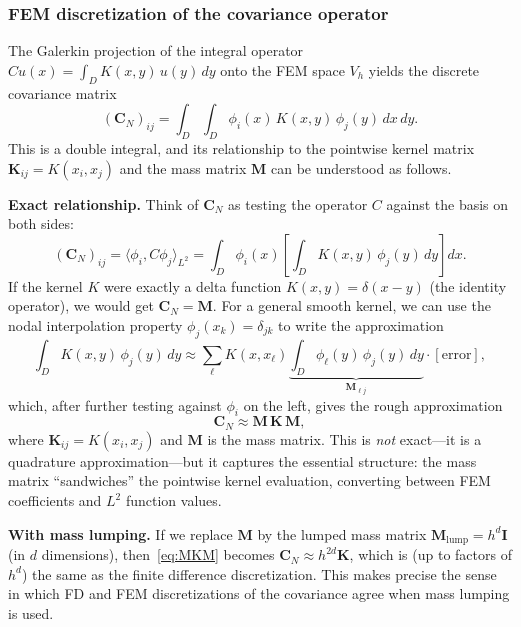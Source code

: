 \documentclass[11pt]{article}
\newcommand{\Cov}{\mathbf{C}}
\newcommand{\bK}{\mathbf{K}}
\newcommand{\bM}{\mathbf{M}}
\begin{document}
\subsubsection{FEM discretization of the covariance operator}\label{sec:FEM_cov}

The Galerkin projection of the integral operator $Cu(x) = \int_D K(x,y)\, u(y)\, dy$ onto the FEM space $V_h$ yields the discrete covariance matrix
\begin{equation}\label{eq:FEM_cov}
  (\Cov_N)_{ij} = \int_D \int_D \phi_i(x)\, K(x,y)\, \phi_j(y)\, dx\, dy.
\end{equation}
This is a double integral, and its relationship to the pointwise kernel matrix $\bK_{ij} = K(x_i, x_j)$ and the mass matrix $\bM$ can be understood as follows.

\medskip\noindent\textbf{Exact relationship.}  Think of $\Cov_N$ as testing the operator $C$ against the basis on both sides:
\[
  (\Cov_N)_{ij} = \langle \phi_i, C \phi_j \rangle_{L^2} 
  = \int_D \phi_i(x) \left[\int_D K(x,y)\, \phi_j(y)\, dy\right] dx.
\]
If the kernel $K$ were exactly a delta function $K(x,y) = \delta(x-y)$ (the identity operator), we would get $\Cov_N = \bM$.  For a general smooth kernel, we can use the nodal interpolation property $\phi_j(x_k) = \delta_{jk}$ to write the approximation
\[
  \int_D K(x,y)\, \phi_j(y)\, dy \approx \sum_{\ell} K(x, x_\ell) \underbrace{\int_D \phi_\ell(y)\, \phi_j(y)\, dy}_{\bM_{\ell j}} \cdot [\text{error}],
\]
which, after further testing against $\phi_i$ on the left, gives the rough approximation
\begin{equation}\label{eq:MKM}
  \Cov_N \approx \bM\, \bK\, \bM,
\end{equation}
where $\bK_{ij} = K(x_i, x_j)$ and $\bM$ is the mass matrix.  This is \emph{not} exact---it is a quadrature approximation---but it captures the essential structure: the mass matrix ``sandwiches'' the pointwise kernel evaluation, converting between FEM coefficients and $L^2$ function values.

\medskip\noindent\textbf{With mass lumping.}  If we replace $\bM$ by the lumped mass matrix $\bM_{\text{lump}} = h^d \mathbf{I}$ (in $d$ dimensions), then~\eqref{eq:MKM} becomes $\Cov_N \approx h^{2d} \bK$, which is (up to factors of $h^d$) the same as the finite difference discretization.  This makes precise the sense in which FD and FEM discretizations of the covariance agree when mass lumping is used.
\end{document}
